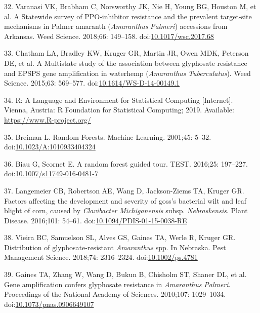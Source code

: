 \documentclass[10pt,letterpaper]{article}
\begin{document}
\leavevmode\hypertarget{ref-varanasi_statewide_2018}{}%
32. Varanasi VK, Brabham C, Norsworthy JK, Nie H, Young BG, Houston M,
et al. A Statewide survey of PPO-inhibitor resistance and the prevalent
target-site mechanisms in Palmer amaranth (\emph{Amaranthus}
\emph{Palmeri}) accessions from Arkansas. Weed Science. 2018;66:
149--158.
doi:\href{https://doi.org/10.1017/wsc.2017.68}{10.1017/wsc.2017.68}

\leavevmode\hypertarget{ref-chatham_multistate_2015}{}%
33. Chatham LA, Bradley KW, Kruger GR, Martin JR, Owen MDK, Peterson DE,
et al. A Multistate study of the association between glyphosate
resistance and EPSPS gene amplification in waterhemp (\emph{Amaranthus}
\emph{Tuberculatus}). Weed Science. 2015;63: 569--577.
doi:\href{https://doi.org/10.1614/WS-D-14-00149.1}{10.1614/WS-D-14-00149.1}

\leavevmode\hypertarget{ref-r_core_team_r:_2019}{}%
34. R: A Language and Environment for Statistical Computing
{[}Internet{]}. Vienna, Austria: R Foundation for Statistical Computing;
2019. Available: \url{https://www.R-project.org/}

\leavevmode\hypertarget{ref-breiman_random_2001}{}%
35. Breiman L. Random Forests. Machine Learning. 2001;45: 5--32.
doi:\href{https://doi.org/10.1023/A:1010933404324}{10.1023/A:1010933404324}

\leavevmode\hypertarget{ref-biau_random_2016}{}%
36. Biau G, Scornet E. A random forest guided tour. TEST. 2016;25:
197--227.
doi:\href{https://doi.org/10.1007/s11749-016-0481-7}{10.1007/s11749-016-0481-7}

\leavevmode\hypertarget{ref-langemeier_factors_2016}{}%
37. Langemeier CB, Robertson AE, Wang D, Jackson-Ziems TA, Kruger GR.
Factors affecting the development and severity of goss's bacterial wilt
and leaf blight of corn, caused by \emph{Clavibacter}
\emph{Michiganensis} subsp. \emph{Nebraskensis}. Plant Disease.
2016;101: 54--61.
doi:\href{https://doi.org/10.1094/PDIS-01-15-0038-RE}{10.1094/PDIS-01-15-0038-RE}

\leavevmode\hypertarget{ref-vieira_distribution_2018}{}%
38. Vieira BC, Samuelson SL, Alves GS, Gaines TA, Werle R, Kruger GR.
Distribution of glyphosate-resistant \emph{Amaranthus} spp. In Nebraska.
Pest Management Science. 2018;74: 2316--2324.
doi:\href{https://doi.org/10.1002/ps.4781}{10.1002/ps.4781}

\leavevmode\hypertarget{ref-gaines_gene_2010}{}%
39. Gaines TA, Zhang W, Wang D, Bukun B, Chisholm ST, Shaner DL, et al.
Gene amplification confers glyphosate resistance in \emph{Amaranthus}
\emph{Palmeri}. Proceedings of the National Academy of Sciences.
2010;107: 1029--1034.
doi:\href{https://doi.org/10.1073/pnas.0906649107}{10.1073/pnas.0906649107}
\end{document}

